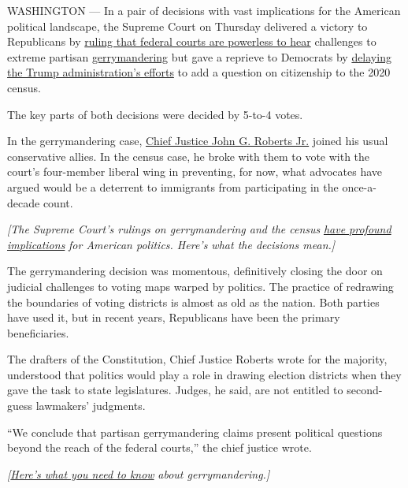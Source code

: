 WASHINGTON --- In a pair of decisions with vast implications for the
American political landscape, the Supreme Court on Thursday delivered a
victory to Republicans by
\href{https://www.supremecourt.gov/opinions/18pdf/18-422_9ol1.pdf}{ruling
that federal courts are powerless to hear} challenges to extreme
partisan
\href{https://www.nytimes3xbfgragh.onion/2020/07/21/us/politics/trump-immigrants-census-redistricting.html}{gerrymandering}
but gave a reprieve to Democrats by
\href{https://www.supremecourt.gov/opinions/18pdf/18-966_bq7c.pdf}{delaying
the Trump administration's efforts} to add a question on citizenship to
the 2020 census.

The key parts of both decisions were decided by 5-to-4 votes.

In the gerrymandering case,
\href{https://www.nytimes3xbfgragh.onion/2019/06/27/us/politics/chief-justice-roberts.html}{Chief
Justice John G. Roberts Jr.} joined his usual conservative allies. In
the census case, he broke with them to vote with the court's four-member
liberal wing in preventing, for now, what advocates have argued would be
a deterrent to immigrants from participating in the once-a-decade count.

\emph{{[}The Supreme Court's rulings on gerrymandering and the census}
\href{https://www.nytimes3xbfgragh.onion/2019/06/27/us/supreme-court-gerrymandering-census.html}{\emph{have
profound implications}} \emph{for American politics. Here's what the
decisions mean.{]}}

The gerrymandering decision was momentous, definitively closing the door
on judicial challenges to voting maps warped by politics. The practice
of redrawing the boundaries of voting districts is almost as old as the
nation. Both parties have used it, but in recent years, Republicans have
been the primary beneficiaries.

The drafters of the Constitution, Chief Justice Roberts wrote for the
majority, understood that politics would play a role in drawing election
districts when they gave the task to state legislatures. Judges, he
said, are not entitled to second-guess lawmakers' judgments.

``We conclude that partisan gerrymandering claims present political
questions beyond the reach of the federal courts,'' the chief justice
wrote.

\emph{{[}}\href{https://www.nytimes3xbfgragh.onion/2019/06/27/us/gerrymander-explainer.html?action=click\&module=Intentional\&pgtype=Article}{\emph{Here's
what you need to know}} \emph{about gerrymandering.{]}}

